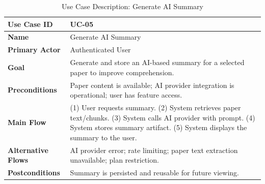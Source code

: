 \begin{table}[H]
    \centering
    \small
    \begin{tabularx}{\textwidth}{|l|X|}
        \hline
        \textbf{Use Case ID}       & UC-05                                                                                                                                                                                         \\
        \hline
        \textbf{Name}              & Generate AI Summary                                                                                                                                                                           \\
        \hline
        \textbf{Primary Actor}     & Authenticated User                                                                                                                                                                            \\
        \hline
        \textbf{Goal}              & Generate and store an AI-based summary for a selected paper to improve comprehension.                                                                                                         \\
        \hline
        \textbf{Preconditions}     & Paper content is available; AI provider integration is operational; user has feature access.                                                                                                  \\
        \hline
        \textbf{Main Flow}         & (1) User requests summary. (2) System retrieves paper text/chunks. (3) System calls AI provider with prompt. (4) System stores summary artifact. (5) System displays the summary to the user. \\
        \hline
        \textbf{Alternative Flows} & AI provider error; rate limiting; paper text extraction unavailable; plan restriction.                                                                                                        \\
        \hline
        \textbf{Postconditions}    & Summary is persisted and reusable for future viewing.                                                                                                                                         \\
        \hline
    \end{tabularx}
    \caption{Use Case Description: Generate AI Summary}
    \label{tab:srs-uc-05}
\end{table}

